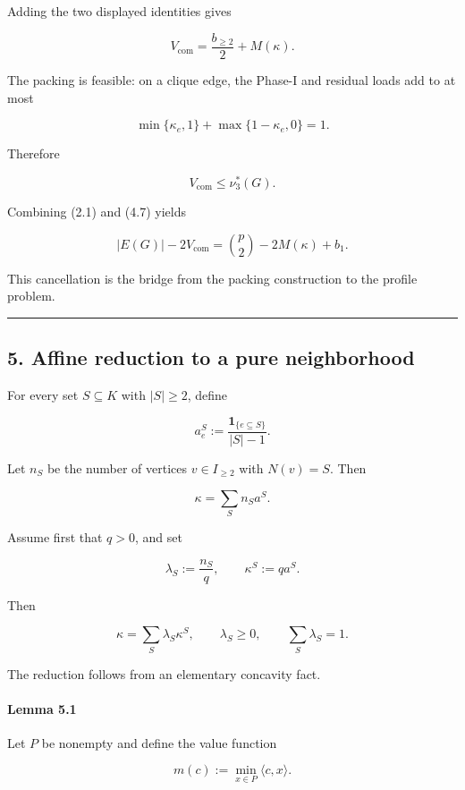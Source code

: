 \documentclass[english,11pt,a4paper]{article}
\newcounter{none}
\begin{document}
Adding the two displayed identities gives

\[
\boxed{
V_{\mathrm{com}}
=
\frac{b_{\ge2}}2+M(\kappa)
}.
\tag{4.7}
\]

The packing is feasible: on a clique edge, the Phase-I and residual
loads add to at most

\[
\min\{\kappa_e,1\}
+
\max\{1-\kappa_e,0\}
=
1.
\]

Therefore

\[
V_{\mathrm{com}}\le\nu_3^*(G).
\tag{4.8}
\]

Combining (2.1) and (4.7) yields

\[
\boxed{
|E(G)|-2V_{\mathrm{com}}
=
\binom{p}{2}-2M(\kappa)+b_1
}.
\tag{4.9}
\]

This cancellation is the bridge from the packing construction to the
profile problem.

\begin{center}\rule{0.5\linewidth}{0.5pt}\end{center}

\subsection{5. Affine reduction to a pure
neighborhood}\label{affine-reduction-to-a-pure-neighborhood}

For every set \(S\subseteq K\) with \(|S|\ge2\), define

\[
a_e^S
:=
\frac{\mathbf1_{\{e\subseteq S\}}}{|S|-1}.
\tag{5.1}
\]

Let \(n_S\) be the number of vertices \(v\in I_{\ge2}\) with \(N(v)=S\).
Then

\[
\kappa=\sum_Sn_Sa^S.
\tag{5.2}
\]

Assume first that \(q>0\), and set

\[
\lambda_S:=\frac{n_S}{q},
\qquad
\kappa^S:=qa^S.
\]

Then

\[
\kappa=\sum_S\lambda_S\kappa^S,
\qquad
\lambda_S\ge0,
\qquad
\sum_S\lambda_S=1.
\tag{5.3}
\]

The reduction follows from an elementary concavity fact.

\paragraph{Lemma 5.1}\label{lemma-5.1}

Let \(P\) be nonempty and define the value function

\[
m(c):=\min_{x\in P}\langle c,x\rangle.
\]
\end{document}
